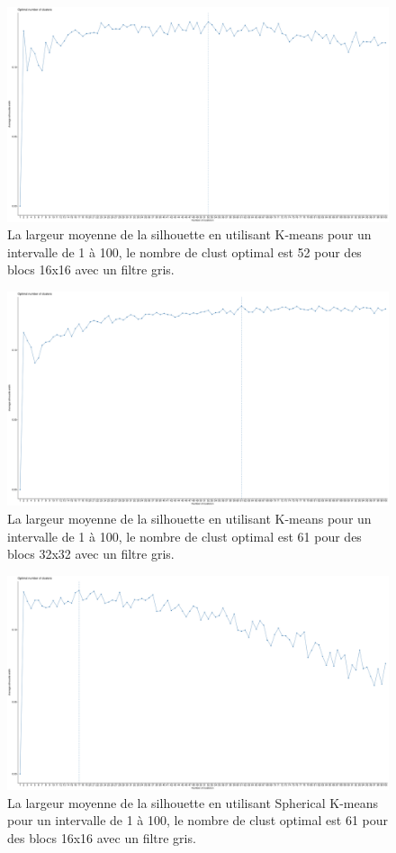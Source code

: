 \documentclass[runningheads]{llncs}
\begin{document}
\begin{figure}
\includegraphics[width=\textwidth]{x16_k_greyscale.png}
\caption{La largeur moyenne de la silhouette en utilisant K-means pour un intervalle de 1 \`a 100, le nombre de clust optimal est 52 pour des blocs 16x16 avec un filtre gris.} \label{fig2}
\end{figure}

\begin{figure}
\includegraphics[width=\textwidth]{x32_k_greyscale.png}
\caption{La largeur moyenne de la silhouette en utilisant K-means pour un intervalle de 1 \`a 100, le nombre de clust optimal est 61 pour des blocs 32x32 avec un filtre gris.} \label{fig3}
\end{figure}

\begin{figure}
\includegraphics[width=\textwidth]{x16_sk_greyscale.png}
\caption{La largeur moyenne de la silhouette en utilisant Spherical K-means pour un intervalle de 1 \`a 100, le nombre de clust optimal est 61 pour des blocs 16x16 avec un filtre gris.} \label{fig4}
\end{figure}
\end{document}
